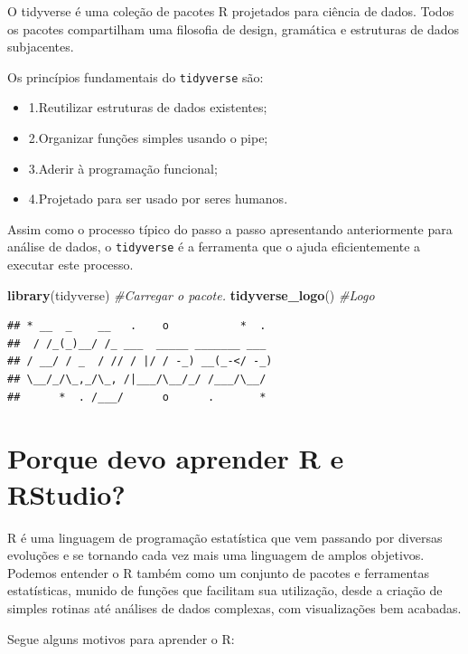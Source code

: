\documentclass[]{book}
\newenvironment{Shaded}{\begin{snugshade}}{\end{snugshade}}
\newcommand{\CommentTok}[1]{\textcolor[rgb]{0.56,0.35,0.01}{\textit{#1}}}
\newcommand{\KeywordTok}[1]{\textcolor[rgb]{0.13,0.29,0.53}{\textbf{#1}}}
\newcommand{\NormalTok}[1]{#1}
\providecommand{\tightlist}{%
  \setlength{\itemsep}{0pt}\setlength{\parskip}{0pt}}
\begin{document}
O tidyverse é uma coleção de pacotes R projetados para ciência de dados. Todos os pacotes compartilham uma filosofia de design, gramática e estruturas de dados subjacentes.

Os princípios fundamentais do \texttt{tidyverse} são:

\begin{itemize}
\tightlist
\item
  1.Reutilizar estruturas de dados existentes;
\item
  2.Organizar funções simples usando o pipe;
\item
  3.Aderir à programação funcional;
\item
  4.Projetado para ser usado por seres humanos.
\end{itemize}

Assim como o processo típico do passo a passo apresentando anteriormente para análise de dados, o \texttt{tidyverse} é a ferramenta que o ajuda eficientemente a executar este processo.

\begin{Shaded}
\begin{Highlighting}[]
\KeywordTok{library}\NormalTok{(tidyverse) }\CommentTok{#Carregar o pacote.}
\KeywordTok{tidyverse_logo}\NormalTok{() }\CommentTok{#Logo}
\end{Highlighting}
\end{Shaded}

\begin{verbatim}
## * __  _    __   .    o           *  . 
##  / /_(_)__/ /_ ___  _____ _______ ___ 
## / __/ / _  / // / |/ / -_) __(_-</ -_)
## \__/_/\_,_/\_, /|___/\__/_/ /___/\__/ 
##      *  . /___/      o      .       *
\end{verbatim}

\hypertarget{porque-devo-aprender-r-e-rstudio}{%
\section{Porque devo aprender R e RStudio?}\label{porque-devo-aprender-r-e-rstudio}}

R é uma linguagem de programação estatística que vem passando por diversas evoluções e se tornando cada vez mais uma linguagem de amplos objetivos. Podemos entender o R também como um conjunto de pacotes e ferramentas estatísticas, munido de funções que facilitam sua utilização, desde a criação de simples rotinas até análises de dados complexas, com visualizações bem acabadas.

Segue alguns motivos para aprender o R:
\end{document}
